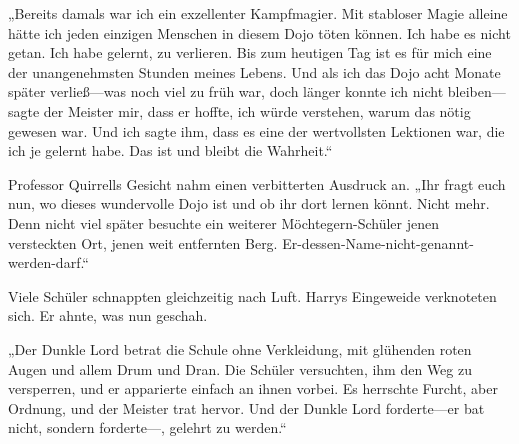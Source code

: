 „Bereits damals war ich ein exzellenter Kampfmagier. Mit stabloser Magie alleine hätte ich jeden einzigen Menschen in diesem Dojo töten können. Ich habe es nicht getan. Ich habe gelernt, zu verlieren. Bis zum heutigen Tag ist es für mich eine der unangenehmsten Stunden meines Lebens. Und als ich das Dojo acht Monate später verließ—was noch viel zu früh war, doch länger konnte ich nicht bleiben—sagte der Meister mir, dass er hoffte, ich würde verstehen, warum das nötig gewesen war. Und ich sagte ihm, dass es eine der wertvollsten Lektionen war, die ich je gelernt habe. Das ist und bleibt die Wahrheit.“

Professor Quirrells Gesicht nahm einen verbitterten Ausdruck an. „Ihr fragt euch nun, wo dieses wundervolle Dojo ist und ob ihr dort lernen könnt. Nicht mehr. Denn nicht viel später besuchte ein weiterer Möchtegern-Schüler jenen versteckten Ort, jenen weit entfernten Berg. Er-dessen-Name-nicht-genannt-werden-darf.“

Viele Schüler schnappten gleichzeitig nach Luft. Harrys Eingeweide verknoteten sich. Er ahnte, was nun geschah.

„Der Dunkle Lord betrat die Schule ohne Verkleidung, mit glühenden roten Augen und allem Drum und Dran. Die Schüler versuchten, ihm den Weg zu versperren, und er apparierte einfach an ihnen vorbei. Es herrschte Furcht, aber Ordnung, und der Meister trat hervor. Und der Dunkle Lord forderte—er bat nicht, sondern forderte—, gelehrt zu werden.“

